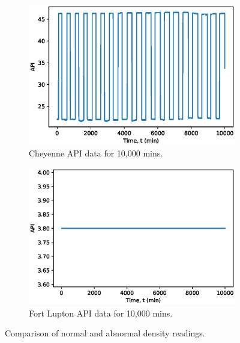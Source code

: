 \begin{figure}[ht]
     \centering
     \begin{subfigure}[b]{0.48\textwidth}
         \centering
         \includegraphics[width=\textwidth]{images/08CheyDensity.eps}
         \caption{Cheyenne API data for 10,000 mins.}
         \label{fig:08GoodDensity}
     \end{subfigure}
     \hfill
     \begin{subfigure}[b]{0.48\textwidth}
         \centering
         \includegraphics[width=\textwidth]{images/08FLDensity.eps}
         \caption{Fort Lupton API data for 10,000 mins.}
         \label{fig:08BadDensity}
     \end{subfigure}
        \caption{Comparison of normal and abnormal density readings.}
        \label{fig:08Density}
\end{figure}

